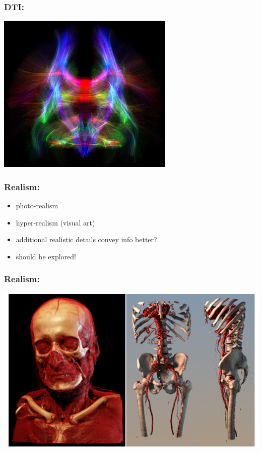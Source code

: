 \documentclass{beamer}
\begin{document}
\begin{frame}
	\frametitle{DTI:}
	\includegraphics[width=\textwidth]{images/tractography}
\end{frame}

\begin{frame}
	\frametitle{Realism:}
	\begin{itemize}
		\item photo-realism
		\item hyper-realism (visual art)
		\item additional realistic details convey info better?
		\item should be explored!
	\end{itemize}
\end{frame}

\begin{frame}
	\frametitle{Realism:}
	\includegraphics[width=\textwidth]{images/medical_visualisation}
\end{frame}
\end{document}
